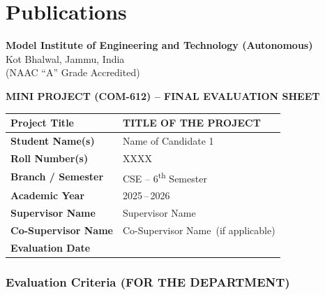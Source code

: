 \documentclass[12pt,a4paper]{report}
\newcommand{\projecttitle}{TITLE OF THE PROJECT}
\newcommand{\studentA}{Name of Candidate 1}
\newcommand{\rollA}{XXXX}
\newcommand{\supervisor}{Supervisor Name}
\newcommand{\cosupervisor}{Co-Supervisor Name}     %
\newcommand{\academicyear}{2025\,--\,2026}
\newcommand{\institute}{Model Institute of Engineering and Technology (Autonomous)}
\newcommand{\instituteloc}{Kot Bhalwal, Jammu, India}
\newcommand{\naac}{(NAAC ``A'' Grade Accredited)}
\numberwithin{equation}{chapter}
\begin{document}
\chapter{Publications}
\label{app:publications}

\newpage
\thispagestyle{empty}

\begin{center}
{\fontsize{14}{17}\selectfont \textbf{\institute}}\\[0.15cm]
{\fontsize{12}{14}\selectfont \instituteloc}\\[0.1cm]
{\fontsize{12}{14}\selectfont \naac}

\vspace{0.8cm}

{\fontsize{16}{19}\selectfont \textbf{MINI PROJECT (COM-612) -- FINAL EVALUATION SHEET}}
\end{center}

\vspace{0.5cm}

\noindent
\begin{tabularx}{\textwidth}{|X|X|}
\hline
\textbf{Project Title}       & \projecttitle \\ \hline
\textbf{Student Name(s)}     & \studentA     \\ \hline
\textbf{Roll Number(s)}      & \rollA        \\ \hline
\textbf{Branch / Semester}   & CSE -- 6\textsuperscript{th} Semester \\ \hline
\textbf{Academic Year}       & \academicyear \\ \hline
\textbf{Supervisor Name}     & \supervisor   \\ \hline
\textbf{Co-Supervisor Name}  & \cosupervisor\ (if applicable) \\ \hline
\textbf{Evaluation Date}     &               \\ \hline
\end{tabularx}

\vspace{0.8cm}

\subsection*{Evaluation Criteria (FOR THE DEPARTMENT)}
\end{document}
